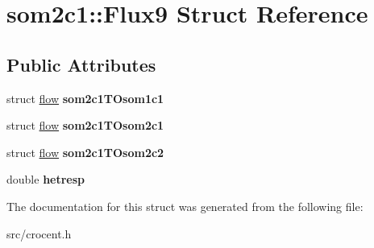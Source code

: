 \hypertarget{structsom2c1_1_1_flux9}{\section{som2c1\-:\-:Flux9 Struct Reference}
\label{structsom2c1_1_1_flux9}
}
\subsection*{Public Attributes}
\begin{DoxyCompactItemize}
\item 
\hypertarget{structsom2c1_1_1_flux9_a51ffcbd96be8d086e37ec995feef70fc}{struct \hyperlink{structflow}{flow} {\bfseries som2c1\-T\-Osom1c1}}\label{structsom2c1_1_1_flux9_a51ffcbd96be8d086e37ec995feef70fc}

\item 
\hypertarget{structsom2c1_1_1_flux9_ab1b16f072eb61c932a9a3571e48499e1}{struct \hyperlink{structflow}{flow} {\bfseries som2c1\-T\-Osom2c1}}\label{structsom2c1_1_1_flux9_ab1b16f072eb61c932a9a3571e48499e1}

\item 
\hypertarget{structsom2c1_1_1_flux9_a00ec1ed63a8b8f602ae1d3fc11a8cd2f}{struct \hyperlink{structflow}{flow} {\bfseries som2c1\-T\-Osom2c2}}\label{structsom2c1_1_1_flux9_a00ec1ed63a8b8f602ae1d3fc11a8cd2f}

\item 
\hypertarget{structsom2c1_1_1_flux9_a054d1b6d733f2e5b420fc4aaa097198f}{double {\bfseries hetresp}}\label{structsom2c1_1_1_flux9_a054d1b6d733f2e5b420fc4aaa097198f}

\end{DoxyCompactItemize}


The documentation for this struct was generated from the following file\-:\begin{DoxyCompactItemize}
\item 
src/crocent.\-h\end{DoxyCompactItemize}
